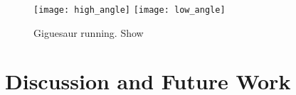 \documentclass{article}
\begin{document}
\begin{figure}[H]
\begin{center}
\texttt{[image: high\_angle]}
\texttt{[image: low\_angle]}
\caption{Giguesaur running. Show}
\end{center}
\end{figure}


\section{Discussion and Future Work}



\begin{comment}
The main limitation of my current implementation of camera localisation is the use of the findChessboardCorners function to locate the relevant features in an image. This function is subject to the limitation that the whole chessboard pattern must be in view of the camera or none of the internal corners' image-space coordinates are given. Without those image-space coordinates the pose estimation algorithm cannot be executed and therefore the camera's location cannot be determined. This effectively limits the puzzle to being played on a tabletop without anyone obscuring the board from another player's iPad, which is at odds with our vision of how the game should be played.

It would be nice to develop a marker tracking system that doesn't require that the whole marker (or all markers) be in view at one time, and if at all possible allow for a marker to be partially obscured without loss of camera location. There has been some research on the topic of partial marker occlusion \cite{occlusion} and I would like to be able to implement a similar system. 
\end{comment}



\nocite{*}


\end{document}
